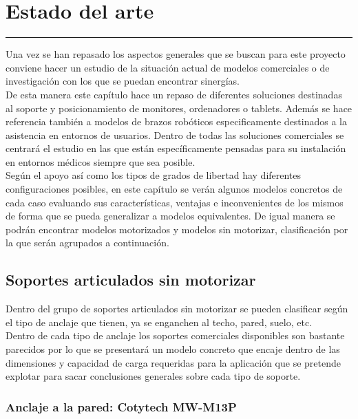 \chapter{Estado del arte} \label{chap:estadoarte}
\hrule
\vspace{3mm}

Una vez se han repasado los aspectos generales que se buscan para este proyecto conviene hacer un estudio de la situación actual de modelos comerciales o de investigación con los que se puedan encontrar sinergías. 
\\

De esta manera este capítulo hace un repaso de diferentes soluciones destinadas al soporte y posicionamiento de monitores, ordenadores o tablets. Además se hace referencia también a modelos de brazos robóticos especificamente destinados a la asistencia en entornos de usuarios. Dentro de todas las soluciones comerciales se centrará el estudio en las que están específicamente pensadas para su instalación en entornos médicos siempre que sea posible.
\\

Según el apoyo así como los tipos de grados de libertad hay diferentes configuraciones posibles, en este capítulo se verán algunos modelos concretos de cada caso evaluando sus características, ventajas e inconvenientes de los mismos de forma que se pueda generalizar a modelos equivalentes. De igual manera se podrán encontrar modelos motorizados y modelos sin motorizar, clasificación por la que serán agrupados a continuación.
\\

\section{Soportes articulados sin motorizar}

Dentro del grupo de soportes articulados sin motorizar se pueden clasificar según el tipo de anclaje que tienen, ya se enganchen al techo, pared, suelo, etc.
\\

Dentro de cada tipo de anclaje los soportes comerciales disponibles son bastante parecidos por lo que se presentará un modelo concreto que encaje dentro de las dimensiones y capacidad de carga requeridas para la aplicación que se pretende explotar para sacar conclusiones generales sobre cada tipo de soporte.

\subsection{Anclaje a la pared: Cotytech MW-M13P}

